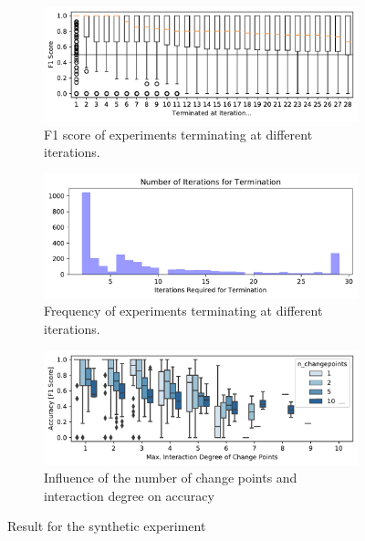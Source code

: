 \documentclass[sigconf]{acmart}
\begin{document}
	\begin{figure}
		\begin{subfigure}{\linewidth}
			\centering
			\includegraphics[width=\linewidth]{images/accuracy_after_termination.pdf}
			\vspace{-5mm}
			\caption{F1 score of experiments terminating at different iterations.}	
			\label{fig:results_rq1_accuracy_terminated}
		\end{subfigure}
		\begin{subfigure}{\linewidth}
			\centering
			\vspace{4mm}
			\includegraphics[width=\linewidth]{images/iterations_for_termination.pdf}
			\vspace{-5mm}
			\caption{Frequency of experiments terminating at different iterations.}	
			\label{fig:results_rq1_frequency}
		\end{subfigure}
		\begin{subfigure}{\linewidth}
			\vspace{4mm}
			\centering
			\includegraphics[width=\linewidth]{images/max_degree_after_termination}
			\caption{Influence of the number of change points and interaction degree on accuracy}	
			\label{fig:results_rq1_degree}
		\end{subfigure}
		\caption{Result for the synthetic experiment}
		\label{fig:results_rq1:results_rq1_degree}
	\end{figure} 	
\end{document}
